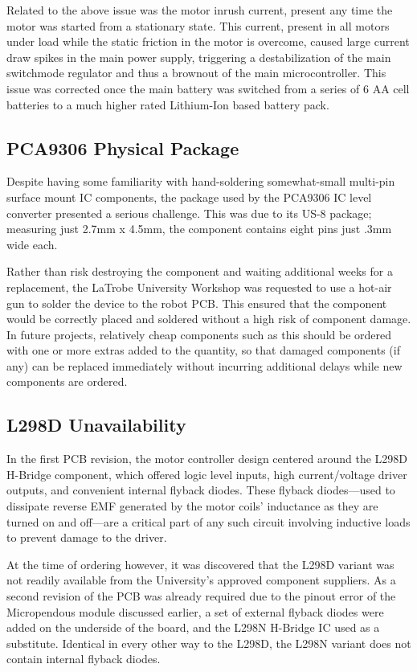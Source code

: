 Related to the above issue was the motor inrush current, present any time the motor was started from a stationary state. This current, present in all motors under load while the static friction in the motor is overcome, caused large current draw spikes in the main power supply, triggering a destabilization of the main switchmode regulator and thus a brownout of the main microcontroller. This issue was corrected once the main battery was switched from a series of 6 AA cell batteries to a much higher rated Lithium-Ion based battery pack.

\subsection{PCA9306 Physical Package}

Despite having some familiarity with hand-soldering somewhat-small multi-pin surface mount IC components, the package used by the PCA9306 IC level converter presented a serious challenge. This was due to its US-8 package; measuring just 2.7mm x 4.5mm, the component contains eight pins just .3mm wide each.

Rather than risk destroying the component and waiting additional weeks for a replacement, the LaTrobe University Workshop was requested to use a hot-air gun to solder the device to the robot PCB. This ensured that the component would be correctly placed and soldered without a high risk of component damage. In future projects, relatively cheap components such as this should be ordered with one or more extras added to the quantity, so that damaged components (if any) can be replaced immediately without incurring additional delays while new components are ordered. 

\subsection{L298D Unavailability}

In the first PCB revision, the motor controller design centered around the L298D H-Bridge component, which offered logic level inputs, high current/voltage driver outputs, and convenient internal flyback diodes. These flyback diodes---used to dissipate reverse EMF generated by the motor coils' inductance as they are turned on and off---are a critical part of any such circuit involving inductive loads to prevent damage to the driver.

At the time of ordering however, it was discovered that the L298D variant was not readily available from the University's approved component suppliers. As a second revision of the PCB was already required due to the pinout error of the Micropendous module discussed earlier, a set of external flyback diodes were added on the underside of the board, and the L298N H-Bridge IC used as a substitute. Identical in every other way to the L298D, the L298N variant does not contain internal flyback diodes.


